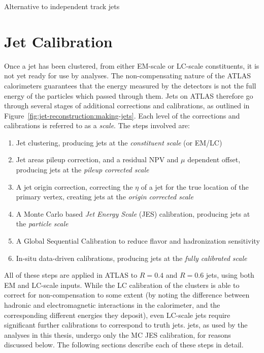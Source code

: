 Alternative to independent track jets


\section{Jet Calibration}

Once a jet has been clustered, from either EM-scale or LC-scale constituents, it is not yet ready for use by analyses. The non-compensating nature of the ATLAS calorimeters guarantees that the energy measured by the detectors is not the full energy of the particles which passed through them. Jets on ATLAS therefore go through several stages of additional corrections and calibrations, as outlined in Figure~\ref{fig:jet-reconstruction:making-jets}. Each level of the corrections and calibrations is referred to as a \textit{scale}. The steps involved are:

\begin{enumerate}
	\item Jet clustering, producing jets at the \textit{constituent scale} (or EM/LC)
	\item Jet areas pileup correction, and a residual NPV and $\mu$ dependent offset, producing jets at the \textit{pileup corrected scale}
	\item A jet origin correction, correcting the $\eta$ of a jet for the true location of the primary vertex, creating jets at the \textit{origin corrected scale}
	\item A Monte Carlo based \textit{Jet Energy Scale} (JES) calibration, producing jets at the \textit{particle scale}
	\item A Global Sequential Calibration to reduce flavor and hadronization sensitivity
	\item In-situ data-driven calibrations, producing jets at the \textit{fully calibrated scale}
\end{enumerate}

All of these steps are applied in ATLAS to $R=0.4$ and $R=0.6$ jets, using both EM and LC-scale inputs. While the LC calibration of the clusters is able to correct for non-compensation to some extent (by noting the difference between hadronic and electromagnetic interactions in the calorimeter, and the corresponding different energies they deposit), even LC-scale jets require significant further calibrations to correspond to truth jets. \LargeR jets, as used by the analyses in this thesis, undergo only the MC JES calibration, for reasons discussed below. The following sections describe each of these steps in detail.


